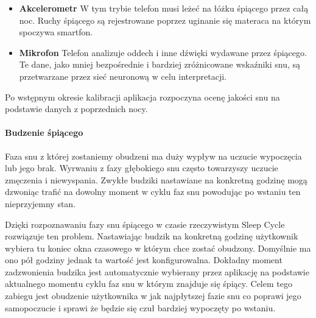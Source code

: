 \begin{itemize}
	\item {\bf Akcelerometr} W tym trybie telefon musi leżeć na łóżku śpiącego przez całą noc. Ruchy śpiącego są rejestrowane poprzez uginanie się materaca na którym spoczywa smartfon. 
	\item {\bf Mikrofon} Telefon analizuje oddech i inne dźwięki wydawane przez śpiącego. Te dane, jako mniej bezpośrednie i bardziej zróżnicowane wskaźniki snu, są przetwarzane przez sieć neuronową w celu interpretacji.
\end{itemize}

Po wstępnym okresie kalibracji aplikacja rozpoczyna ocenę jakości snu na podstawie danych z poprzednich nocy.


\paragraph{Budzenie śpiącego}
Faza snu z której zostaniemy obudzeni ma duży wypływ na uczucie wypoczęcia lub jego brak. Wyrwaniu z fazy głębokiego snu często towarzyszy uczucie zmęczenia i niewyspania. Zwykłe budziki nastawiane na konkretną godzinę mogą dzwoniąc trafić na dowolny moment w cyklu faz snu powodując po wstaniu ten nieprzyjemny stan. 

Dzięki rozpoznawaniu fazy snu śpiącego w czasie rzeczywistym Sleep Cycle rozwiązuje ten problem. Nastawiając budzik na konkretną godzinę użytkownik wybiera tu koniec okna czasowego w którym chce zostać obudzony. Domyślnie ma ono pół godziny jednak ta wartość jest konfigurowalna. Dokładny moment zadzwonienia budzika jest automatycznie wybierany przez aplikację na podstawie aktualnego momentu cyklu faz snu w którym znajduje się śpiący. Celem tego zabiegu jest obudzenie użytkownika w jak najpłytszej fazie snu co poprawi jego samopoczucie i sprawi że będzie się czuł bardziej wypoczęty po wstaniu.
